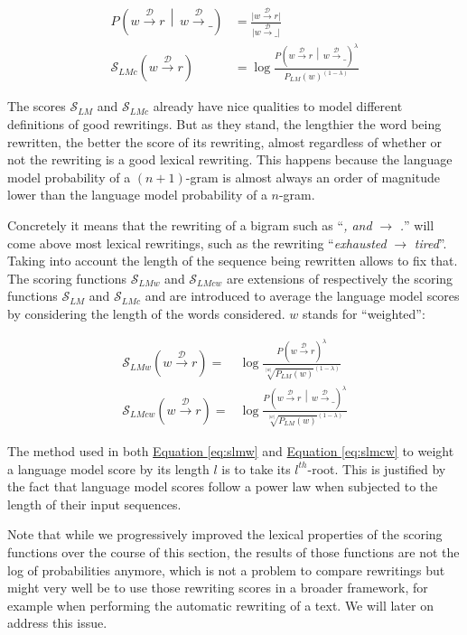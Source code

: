 \documentclass[a4paper, 11pt, onepage]{scrreprt}
\newcommand\equaref[1]{\hyperref[#1]{Equation \ref*{#1}}}
\newcommand\maps[1]{\xrightarrow{\mathcal{#1}}}
\newcommand\card[1]{\lvert #1 \rvert}
\newcommand\given{\, \middle| \,}
\newcommand\proba[2][]{P_{#1} \left( #2 \right)}
\begin{document}
\begin{align}
  \label{eq:probcond}
  \proba{w \maps{D} r \given w \maps{D} \_} & = \frac%
  {\card{w \maps{D} r}}%
  {\card{w \maps{D} \_}} \\
  \label{eq:slmc}
  \mathcal{S}_{LMc}(w \maps{D} r) & = \log \frac%
  {\proba{w \maps{D} r \given w \maps{D} \_}^\lambda}%
  {\proba[LM]{w}^{(1 - \lambda)}}
\end{align}

The scores $\mathcal{S}_{LM}$ and $\mathcal{S}_{LMc}$ already have
nice qualities to model different definitions of good rewritings. But
as they stand, the lengthier the word being rewritten, the better the
score of its rewriting, almost regardless of whether or not the
rewriting is a good lexical rewriting. This happens because the
language model probability of a $(n+1)$-gram is almost always an order
of magnitude lower than the language model probability of a
$n$-gram.

Concretely it means that the rewriting of a bigram such as “\emph{,
  and} $\rightarrow$ \emph{.}”  will come above most lexical
rewritings, such as the rewriting “\emph{exhausted} $\rightarrow$
\emph{tired}”. Taking into account the length of the sequence being
rewritten allows to fix that. The scoring functions
$\mathcal{S}_{LMw}$ and $\mathcal{S}_{LMcw}$ are extensions of
respectively the scoring functions $\mathcal{S}_{LM}$ and
$\mathcal{S}_{LMc}$ and are introduced to average the language model
scores by considering the length of the words considered. $w$ stands
for “weighted”:

\begin{align}
  \label{eq:slmw}
  \mathcal{S}_{LMw}(w \maps{D} r) = & \log \frac%
  {\proba{w \maps{D} r}^\lambda}%
  {\sqrt[\card{w}]{\proba[LM]{w}}^{(1 - \lambda)}} \\
  \label{eq:slmcw}
  \mathcal{S}_{LMcw}(w \maps{D} r) = & \log \frac%
  {\proba{w \maps{D} r \given w \maps{D} \_}^\lambda}%
  {\sqrt[\card{w}]{\proba[LM]{w}}^{(1 - \lambda)}}
\end{align}

The method used in both \equaref{eq:slmw} and \equaref{eq:slmcw} to
weight a language model score by its length $l$ is to take its
$l^{th}$-root. This is justified by the fact that language model
scores follow a power law when subjected to the length of their input
sequences.

Note that while we progressively improved the lexical properties of
the scoring functions over the course of this section, the results of
those functions are not the log of probabilities anymore, which is not
a problem to compare rewritings but might very well be to use those
rewriting scores in a broader framework, for example when performing
the automatic rewriting of a text. We will later on address this
issue.
\end{document}
